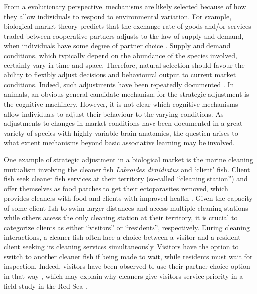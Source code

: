 \documentclass[]{rsos}%
\begin{document}
From a evolutionary perspective, mechanisms are likely selected because
of how they allow individuals to respond to environmental variation.
For example, biological market theory predicts that the exchange rate of goods
and/or services traded between cooperative partners adjusts to the
law of supply and demand, when individuals have some degree of partner choice
\citep{noe_Biological_1995}. Supply and demand conditions, which typically
depend on the abundance of the species involved, certainly vary in time
and space. Therefore, natural selection should favour the ability
to flexibly adjust decisions and behavioural output to
current market conditions. Indeed, such adjustments have been repeatedly
documented \citep{axen_Signalling_1996}. In animals, an obvious general candidate
mechanism for the strategic adjustment is the cognitive machinery. However,
it is not clear which cognitive mechanisms allow individuals to adjust their
behaviour to the varying conditions. As adjustments to changes in
market conditions have been documented in a great variety of species with
highly variable brain anatomies, the question arises to what extent
mechanisms beyond basic associative learning may be involved.

One example of strategic adjustment in a biological market is the marine
cleaning mutualism involving the cleaner fish \emph{Labroides dimidiatus} and
`client' fish. Client fish seek cleaner fish services at their territory
(so-called ``cleaning station'') and offer themselves as food patches
to get their ectoparasites removed, which provides cleaners
with food and clients with improved health \citep{waldie_LongTerm_2011, ros_Does_2011, triki_Effects_2016, demaire_Reduced_2020}.
Given the capacity of some client fish to swim larger distances and
access multiple cleaning stations while others access the only cleaning
station at their territory, it is crucial to categorize clients as
either ``visitors'' or ``residents'', respectively. During cleaning interactions,
a cleaner fish often face a choice between a visitor and a resident client
seeking its cleaning services simultaneously. Visitors have the option
to switch to another cleaner fish if being made to wait, while residents
must wait for inspection. Indeed,
visitors have been observed to use their partner choice option in that
way \citep{bshary_Choosy_2002}, which may explain why cleaners give
visitors service priority in a field study in the Red Sea
\citep{bshary_Cleaner_2001}.
\end{document}
